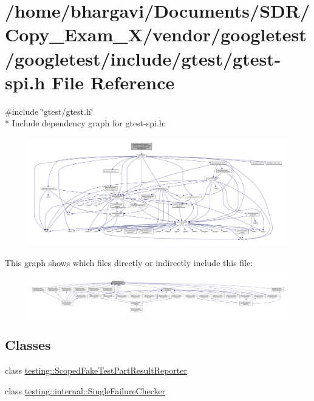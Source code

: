\hypertarget{gtest-spi_8h}{}\section{/home/bhargavi/\+Documents/\+S\+D\+R/\+Copy\+\_\+\+Exam\+\_\+X/vendor/googletest/googletest/include/gtest/gtest-\/spi.h File Reference}
\label{gtest-spi_8h}
{\ttfamily \#include \char`\"{}gtest/gtest.\+h\char`\"{}}\\*
Include dependency graph for gtest-\/spi.h\+:
\nopagebreak
\begin{figure}[H]
\begin{center}
\leavevmode
\includegraphics[width=350pt]{gtest-spi_8h__incl}
\end{center}
\end{figure}
This graph shows which files directly or indirectly include this file\+:
\nopagebreak
\begin{figure}[H]
\begin{center}
\leavevmode
\includegraphics[width=350pt]{gtest-spi_8h__dep__incl}
\end{center}
\end{figure}
\subsection*{Classes}
\begin{DoxyCompactItemize}
\item 
class \hyperlink{classtesting_1_1_scoped_fake_test_part_result_reporter}{testing\+::\+Scoped\+Fake\+Test\+Part\+Result\+Reporter}
\item 
class \hyperlink{classtesting_1_1internal_1_1_single_failure_checker}{testing\+::internal\+::\+Single\+Failure\+Checker}
\end{DoxyCompactItemize}
